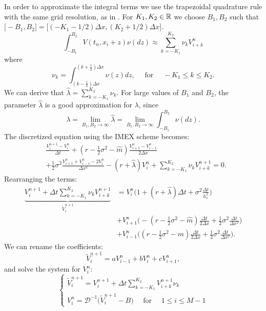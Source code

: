 In order to approximate the integral terms we use the trapezoidal quadrature rule with the same grid resolution, as in \cite{CoVo05b}. 
For $K_1,K_2 \in \mathbb{R}$ we choose $B_1,B_2$ such that $ \bigl[-B_1,B_2\bigr] = \bigl[ ( -K_1-1/2 )\Delta x , ( K_2+1/2 )\Delta x \bigr] $.
\begin{equation}\label{trap_quad}
 \int_{-B_1}^{B_2}  V(t_n,x_i+z) \nu(dz) \approx \sum_{k = -K_1}^{K_2} \nu_k V^{n}_{i+k}
\end{equation}
where
\begin{equation}\label{nu1}
 \nu_k = \int_{(k-\frac{1}{2}) \Delta x}^{(k+\frac{1}{2}) \Delta x} \nu(z) dz, \hspace{1em} \mbox{ for } \hspace{1em} -K_1 \leq k \leq K_2. 
\end{equation}
We can derive that $ \hat \lambda = \sum_{k = -K_1}^{K_2} \nu_k $. For large values of $B_1$ and $B_2$, the parameter $\hat \lambda$ is a good approximation for $\lambda$, since
$$\lambda = \lim_{B_1,B_2 \to \infty} \hat \lambda = \lim_{B_1,B_2 \to \infty} \int_{-B_1}^{B_2} \nu(dz).$$
The discretized equation using the IMEX scheme becomes: 
\begin{align}
&\frac{V^{n+1}_{i} -V^{n}_{i}}{\Delta t} + 
(r-\frac{1}{2}\sigma^2 - \hat m) \frac{V^{n}_{i+1} -V^{n}_{i-1}}{ 2 \Delta x} \\ \nonumber
&+ \frac{1}{2} \sigma^2 \frac{V^{n}_{i+1} + V^{n}_{i-1} - 2 V^{n}_{i}}{\Delta x^2}  - (r+\hat \lambda) V^{n}_i +\sum_{k = -K_1}^{K_2} \nu_k V^{n+1}_{i+k} = 0.
\end{align}
Rearranging the terms: 
\begin{align*}
\underbrace{ V^{n+1}_{i} + \Delta t \sum_{k = -K_1}^{K_2} \nu_k V^{n+1}_{i+k} }_{\tilde V^{n+1}_i} &= 
	V^{n}_{i} \biggl( 1 + (r+\hat \lambda)\Delta t + \sigma^2 \frac{\Delta t}{h_x^2} \biggr)  \\
& + V^{n}_{i+1} \biggl( -(r -\frac{1}{2}\sigma^2 -\hat m )\frac{\Delta t}{2 \Delta x} +
\frac{1}{2}\sigma^2 \frac{\Delta t}{\Delta x^2}  \biggr)  \\
& + V^{n}_{i-1} \biggl( (r -\frac{1}{2}\sigma^2 - \hat m)\frac{\Delta t}{2 \Delta x} + 
\frac{1}{2}\sigma^2 \frac{\Delta t}{\Delta x^2}  \biggr).
\end{align*}
We can rename the coefficients:
$$ \tilde V^{n+1}_{i} = a V^{n}_{i-1} + b V^{n}_{i} + c V^{n}_{i+1}, $$
and solve the system for $V^{n}_{i}$:
\begin{equation*}
 \begin{cases}
  \tilde V^{n+1}_i = V^{n+1}_{i} + \Delta t \sum_{k = -K_1}^{K_2} V^{n+1}_{i+k} \nu_k \\
  V^{n}_{i} = \mathcal{D}^{-1} \biggl( \tilde V^{n+1}_{i} - B \biggr) \quad \mbox{ for } \quad 1 \leq i \leq M-1  
 \end{cases}
\end{equation*}
